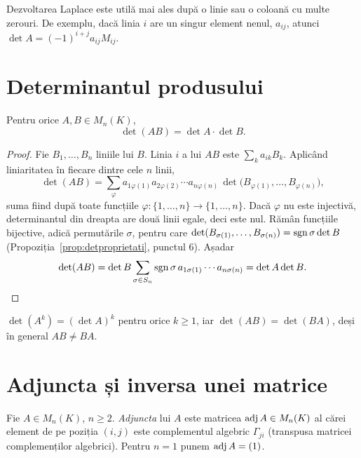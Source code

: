 \begin{observatie}
Dezvoltarea Laplace este utilă mai ales după o linie sau o coloană cu multe zerouri. De exemplu, dacă linia $i$ are un singur element nenul, $a_{ij}$, atunci $\det A=(-1)^{i+j}a_{ij}M_{ij}$.
\end{observatie}

\section{Determinantul produsului}

\begin{teorema}\label{teo:detprodus}
Pentru orice $A,B\in M_n(K)$,
\[
\det(AB)=\det A\cdot\det B .
\]
\end{teorema}

\begin{proof}
Fie $B_1,\dots,B_n$ liniile lui $B$. Linia $i$ a lui $AB$ este $\sum_{k}a_{ik}B_k$. Aplicând liniaritatea în fiecare dintre cele $n$ linii,
\[
\det(AB)=\sum_{\varphi}a_{1\varphi(1)}a_{2\varphi(2)}\cdots a_{n\varphi(n)}\,\det\bigl(B_{\varphi(1)},\dots,B_{\varphi(n)}\bigr),
\]
suma fiind după toate funcțiile $\varphi:\{1,\dots,n\}\to\{1,\dots,n\}$. Dacă $\varphi$ nu este injectivă, determinantul din dreapta are două linii egale, deci este nul. Rămân funcțiile bijective, adică permutările $\sigma$, pentru care $\det(B_{\sigma(1)},\dots,B_{\sigma(n)})=\operatorname{sgn}\sigma\det B$ (Propoziția~\ref{prop:detproprietati}, punctul 6). Așadar
\[
\det(AB)=\det B\sum_{\sigma\in S_n}\operatorname{sgn}\sigma\,a_{1\sigma(1)}\cdots a_{n\sigma(n)}=\det A\det B.\qedhere
\]
\end{proof}

\begin{corolar}
$\det(A^k)=(\det A)^k$ pentru orice $k\ge1$, iar $\det(AB)=\det(BA)$, deși în general $AB\neq BA$.
\end{corolar}

\section{Adjuncta și inversa unei matrice}

\begin{definitie}
Fie $A\in M_n(K)$, $n\ge2$. \emph{Adjuncta} lui $A$ este matricea $\operatorname{adj} A\in M_n(K)$ al cărei element de pe poziția $(i,j)$ este complementul algebric $\Gamma_{ji}$ (transpusa matricei complemenților algebrici). Pentru $n=1$ punem $\operatorname{adj} A=(1)$.
\end{definitie}

